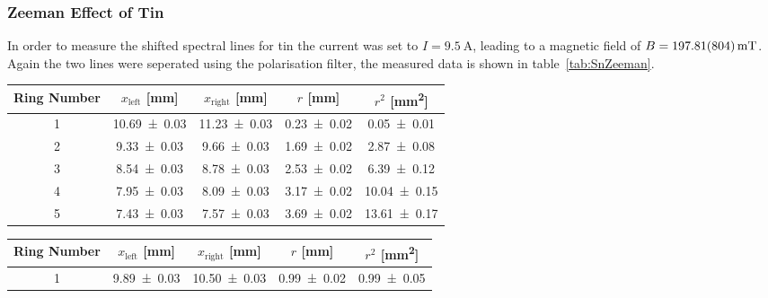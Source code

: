 \subsubsection{Zeeman Effect of Tin}
\label{toc:SnZeeman}
In order to measure the shifted spectral lines for tin the current was set to $I = \SI{9.5}{\ampere}$, leading to a magnetic field of $B = \SI{197.81 \pm 8.04}{\milli\tesla}$. 
Again the two lines were seperated using the polarisation filter, the measured data is shown in table~\ref{tab:SnZeeman}.
\begin{table}[ht]
	\centering
	\begin{minipage}{0.48\textwidth}
		\begin{adjustbox}{width=\textwidth}
			\centering
			\begin{tabular}{c c c c c}
				Ring Number		& $x_\text{left}$ [\si{\mm}]	& $x_\text{right}$ [\si{\mm}]	& $r$ [\si{\mm}]	& $r^2$ [\si{\mm\squared}]	\\
				\hline
				1			& \num{10.69 \pm 0.03} 		& \num{11.23 \pm 0.03} 		& \num{0.23 \pm 0.02} 	& \num{0.05 \pm 0.01} 		\\
				2			& \num{9.33 \pm 0.03} 		& \num{9.66 \pm 0.03} 		& \num{1.69 \pm 0.02} 	& \num{2.87 \pm 0.08} 		\\
				3			& \num{8.54 \pm 0.03} 		& \num{8.78 \pm 0.03} 		& \num{2.53 \pm 0.02} 	& \num{6.39 \pm 0.12} 		\\
				4			& \num{7.95 \pm 0.03} 		& \num{8.09 \pm 0.03} 		& \num{3.17 \pm 0.02} 	& \num{10.04 \pm 0.15} 		\\
				5			& \num{7.43 \pm 0.03} 		& \num{7.57 \pm 0.03} 		& \num{3.69 \pm 0.02} 	& \num{13.61 \pm 0.17} 		\\
			\end{tabular}
		\end{adjustbox}
	\end{minipage}
	\hfill
	\begin{minipage}{0.48\textwidth}
		\begin{adjustbox}{width=\textwidth}
			\centering
			\begin{tabular}{c c c c c}
				Ring Number		& $x_\text{left}$ [\si{\mm}]	& $x_\text{right}$ [\si{\mm}]	& $r$ [\si{\mm}]	& $r^2$ [\si{\mm\squared}]	\\
				\hline
				1			& \num{9.89 \pm 0.03} 		& \num{10.50 \pm 0.03} 		& \num{0.99 \pm 0.02} 	& \num{0.99 \pm 0.05} 		\\

\end{tabular}
\end{adjustbox}
\end{minipage}
\end{table}
